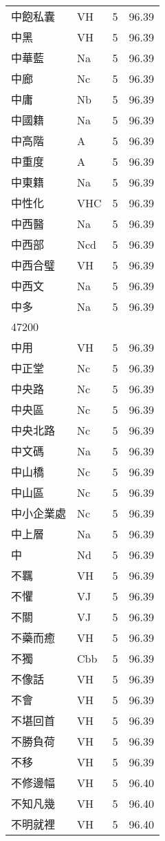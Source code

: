 \documentclass[twocolumn]{book}
\begin{document}
\begin{supertabular}{llrr}
中飽私囊 & VH & 5 &  96.39\\
中黑 & VH & 5 &  96.39\\
中華藍 & Na & 5 &  96.39\\
中廊 & Nc & 5 &  96.39\\
中庸 & Nb & 5 &  96.39\\
中國籍 & Na & 5 &  96.39\\
中高階 & A & 5 &  96.39\\
中重度 & A & 5 &  96.39\\
中東籍 & Na & 5 &  96.39\\
中性化 & VHC & 5 &  96.39\\
中西醫 & Na & 5 &  96.39\\
中西部 & Ncd & 5 &  96.39\\
中西合璧 & VH & 5 &  96.39\\
中西文 & Na & 5 &  96.39\\
中多 & Na & 5 &  96.39\\
47200\\
中用 & VH & 5 &  96.39\\
中正堂 & Nc & 5 &  96.39\\
中央路 & Nc & 5 &  96.39\\
中央區 & Nc & 5 &  96.39\\
中央北路 & Nc & 5 &  96.39\\
中文碼 & Na & 5 &  96.39\\
中山橋 & Nc & 5 &  96.39\\
中山區 & Nc & 5 &  96.39\\
中小企業處 & Nc & 5 &  96.39\\
中上層 & Na & 5 &  96.39\\
中 & Nd & 5 &  96.39\\
不羈 & VH & 5 &  96.39\\
不懼 & VJ & 5 &  96.39\\
不關 & VJ & 5 &  96.39\\
不藥而癒 & VH & 5 &  96.39\\
不獨 & Cbb & 5 &  96.39\\
不像話 & VH & 5 &  96.39\\
不會 & VH & 5 &  96.39\\
不堪回首 & VH & 5 &  96.39\\
不勝負荷 & VH & 5 &  96.39\\
不移 & VH & 5 &  96.39\\
不修邊幅 & VH & 5 &  96.40\\
不知凡幾 & VH & 5 &  96.40\\
不明就裡 & VH & 5 &  96.40\\

\end{supertabular}
\end{document}
